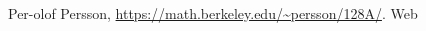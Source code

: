\documentclass[12pt]{article}
\begin{document}






 \newpage
 \begin{thebibliography}{1}

      Per-olof Persson, \url{https://math.berkeley.edu/~persson/128A/}. Web

  \end{thebibliography}
\end{document}
